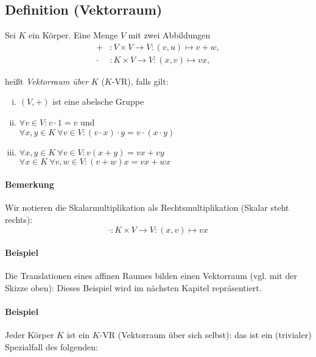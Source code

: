 \subsection{Definition (Vektorraum)}
	\begin{Definition}[Vektorraum]
		Sei $K$ ein Körper. Eine Menge $V$ mit zwei Abbildungen
	\begin{align*}
		 +&: V \times V \to V:(v,u)\mapsto v+w,\\
		 \cdot &: K \times V \to V:(x,v)\mapsto vx,
	\end{align*}
	
	heißt \emph{Vektorraum über $K$} ($K$-VR), falls gilt:
	\begin{enumerate}[(i)]
		\item $(V,+)$ ist eine abelsche Gruppe
		\item $\forall v\in V: v\cdot 1=v$ und\\
                      $\forall x,y \in K\ \forall v\in V: (v\cdot x)\cdot y = v\cdot (x\cdot y)$
		\item $\forall x,y \in K\ \forall v\in V: v(x+y) = vx + vy$\\
                      $\forall x\in K\ \forall v,w\in V: (v+w)x = vx + wx$
	\end{enumerate}
	\end{Definition}

\paragraph{Bemerkung}
	Wir notieren die Skalarmultiplikation als Rechtsmultiplikation (Skalar steht rechts):
		\[ \cdot: K \times V \to V : (x,v) \mapsto vx \]

\paragraph{Beispiel}
	Die Translationen eines affinen Raumes bilden einen Vektorraum (vgl. mit der Skizze oben): Dieses Beispiel wird im nächsten Kapitel repräsentiert.
	
\paragraph{Beispiel}
	Jeder Körper $ K $ ist ein $ K $-VR (Vektorraum über sich selbst): das ist ein (trivialer) Spezialfall des folgenden:
	
